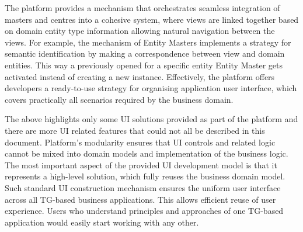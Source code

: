   The platform provides a mechanism that orchestrates seamless integration of masters and centres into a cohesive system, where views are linked together based on domain entity type information allowing natural navigation between the views.
  For example, the mechanism of Entity Masters implements a strategy for semantic identification by making a correspondence between view and domain entities.
  This way a previously opened for a specific entity Entity Master gets activated instead of creating a new instance.
  Effectively, the platform offers developers a ready-to-use strategy for organising application user interface, which covers practically all scenarios required by the business domain.

  The above highlights only some UI solutions provided as part of the platform and there are more UI related features that could not all be described in this document.
  Platform's modularity ensures that UI controls and related logic cannot be mixed into domain models and implementation of the business logic.
  The most important aspect of the provided UI development model is that it represents a high-level solution, which fully reuses the business domain model.
  Such standard UI construction mechanism ensures the uniform user interface across all TG-based business applications.
  This allows efficient reuse of user experience.
  Users who understand principles and approaches of one TG-based application would easily start working with any other.